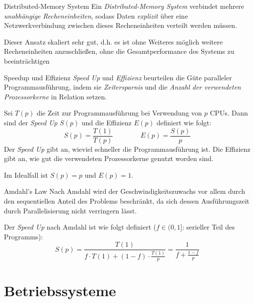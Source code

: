 \documentclass[german]{spicker}
\begin{document}
\begin{defi}{Distributed-Memory System}
    Ein \emph{Distributed-Memory System} verbindet mehrere
    \emph{unabhängige Recheneinheiten}, sodass Daten \emph{explizit} über eine Netzwerkverbindung
    zwischen dieses Recheneinheiten verteilt werden müssen.

    Dieser Ansatz skaliert sehr gut, d.h. es ist
    ohne Weiteres möglich weitere Recheneinheiten anzuschließen, ohne die Gesamtperformance
    des Systems zu beeinträchtigen
\end{defi}

\begin{bonus}{Speedup und Effizienz}
    \emph{Speed Up} und \emph{Effizienz} beurteilen die Güte paralleler Programmausführung, indem sie \emph{Zeitersparnis} und die \emph{Anzahl der verwendeten Prozessorkerne} in Relation setzen.

    Sei $T(p)$ die Zeit zur Programmausführung bei Verwendung von $p$ CPUs. Dann sind der \emph{Speed Up} $S(p)$ und die Effizienz $E(p)$ definiert wie folgt:
    $$
        S(p) = \frac{T(1)}{T(p)} \qquad  \qquad E(p) = \frac{S(p)}{p}
    $$
    Der \emph{Speed Up} gibt an, wieviel schneller die Programmausführung ist.
    Die Effizienz gibt an, wie gut die verwendeten Prozessorkerne genutzt worden sind.

    Im Idealfall ist $S(p) = p$ und $E(p) = 1$.
\end{bonus}

\begin{bonus}{Amdahl's Law}
    Nach Amdahl wird der Geschwindigkeitszuwachs vor allem durch den sequentiellen Anteil des Problems beschränkt, da sich dessen Ausführungszeit durch Parallelisierung nicht verringern lässt.

    Der \emph{Speed Up} nach Amdahl ist wie folgt definiert ($f \in (0, 1]$: serieller Teil des Programms):
    $$
        S(p) = \frac{T(1)}{f \cdot T(1) + (1-f) \cdot \frac{T(1)}{p}} = \frac{1}{f + \frac{1-f}{p}}
    $$
\end{bonus}

\section{Betriebssysteme}
\end{document}

